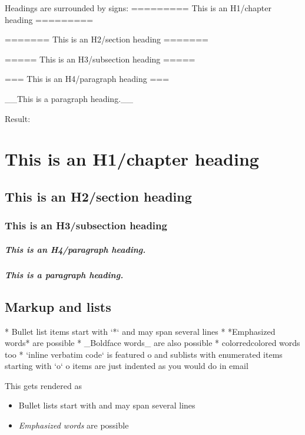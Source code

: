 \documentclass[%
twoside,                 %
draft,                   %
final,                   %
chapterprefix=true,      %
open=right               %
10pt]{book}
\begin{document}
\begin{shadedquoteBlue}
Headings are surrounded by \code{=} signs:
\bccq
========= This is an H1/chapter heading =========

======= This is an H2/section heading =======

===== This is an H3/subsection heading =====

=== This is an H4/paragraph heading ===

__This is a paragraph heading.__
\eccq

Result:

\chapter{This is an H1/chapter heading}

\section*{This is an H2/section heading}

\subsection*{This is an H3/subsection heading}

\paragraph{This is an H4/paragraph heading.}
\paragraph{This is a paragraph heading.}
\section*{Markup and lists}

\bccq
 * Bullet list items start with `*`
   and may span several lines
 * *Emphasized words* are possible
 * _Boldface words_ are also possible
 * color{red}{colored words} too
 * `inline verbatim code` is featured
   o and sublists with enumerated items starting with `o`
   o items are just indented as you would do in email
\eccq

This gets rendered as

\begin{itemize}
 \item Bullet lists start with \code{*}
   and may span several lines

 \item \emph{Emphasized words} are possible


\end{itemize}
\end{shadedquoteBlue}
\end{document}
